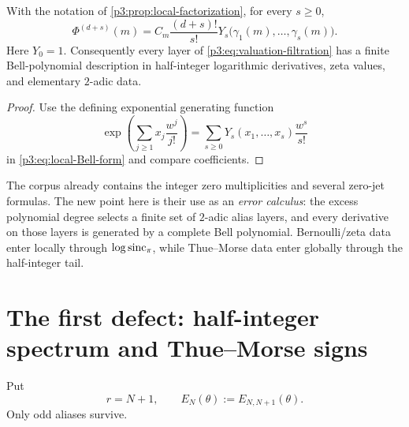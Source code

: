 \documentclass[11pt,oneside]{article}
\numberwithin{equation}{section}
\theoremstyle{definition}
\theoremstyle{remark}
\begin{document}
\begin{corollary}
\label{p3:cor:Bell-zero-jets}
With the notation of \cref{p3:prop:local-factorization}, for every $s\ge0$,
\begin{equation}
 \boxed{\displaystyle
 \Phi^{(d+s)}(m)
 =C_m\frac{(d+s)!}{s!}
 Y_s\bigl(\gamma_1(m),\ldots,\gamma_s(m)\bigr).}
 \label{p3:eq:Bell-zero-jets}
\end{equation}
Here $Y_0=1$.  Consequently every layer of \eqref{p3:eq:valuation-filtration} has a finite Bell-polynomial description in half-integer logarithmic derivatives, zeta values, and elementary $2$-adic data.
\end{corollary}

\begin{proof}
Use the defining exponential generating function
\[
 \exp\!\left(\sum_{j\ge1}x_j\frac{w^j}{j!}\right)
 =\sum_{s\ge0}Y_s(x_1,\ldots,x_s)\frac{w^s}{s!}
\]
in \eqref{p3:eq:local-Bell-form} and compare coefficients.
\end{proof}

\begin{resultbox}
The corpus already contains the integer zero multiplicities and several zero-jet formulas.  The new point here is their use as an \emph{error calculus}: the excess polynomial degree selects a finite set of $2$-adic alias layers, and every derivative on those layers is generated by a complete Bell polynomial.  Bernoulli/zeta data enter locally through $\log\operatorname{sinc}_{\pi}$, while Thue--Morse data enter globally through the half-integer tail.
\end{resultbox}

\section{The first defect: half-integer spectrum and Thue--Morse signs}
\label{p3:sec:first-defect}

Put
\begin{equation}
 r=N+1,
 \qquad
 E_N(\theta):=E_{N,N+1}(\theta).
 \label{p3:eq:first-defect-def}
\end{equation}
Only odd aliases survive.
\end{document}
